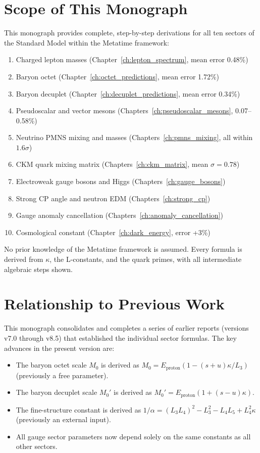 \section{Scope of This Monograph}

This monograph provides complete, step-by-step derivations for all ten sectors
of the Standard Model within the Metatime framework:

\begin{enumerate}
\item Charged lepton masses (Chapter~\ref{ch:lepton_spectrum}, mean error 0.48\%)
\item Baryon octet (Chapter~\ref{ch:octet_predictions}, mean error 1.72\%)
\item Baryon decuplet (Chapter~\ref{ch:decuplet_predictions}, mean error 0.34\%)
\item Pseudoscalar and vector mesons (Chapters~\ref{ch:pseudoscalar_mesons}, 0.07--0.58\%)
\item Neutrino PMNS mixing and masses (Chapters~\ref{ch:pmns_mixing}, all within \(1.6\sigma\))
\item CKM quark mixing matrix (Chapters~\ref{ch:ckm_matrix}, mean \(\sigma = 0.78\))
\item Electroweak gauge bosons and Higgs (Chapters~\ref{ch:gauge_bosons})
\item Strong CP angle and neutron EDM (Chapters~\ref{ch:strong_cp})
\item Gauge anomaly cancellation (Chapters~\ref{ch:anomaly_cancellation})
\item Cosmological constant (Chapter~\ref{ch:dark_energy}, error +3\%)
\end{enumerate}

No prior knowledge of the Metatime framework is assumed.  Every formula is
derived from \(\kappa\), the L-constants, and the quark primes, with all
intermediate algebraic steps shown.

\section{Relationship to Previous Work}

This monograph consolidates and completes a series of earlier reports
(versions v7.0 through v8.5) that established the individual sector formulas.
The key advances in the present version are:

\begin{itemize}
\item The baryon octet scale \(M_0\) is derived as
\(M_0 = E_{\text{proton}}(1 - (s+u)\kappa/L_3)\) (previously a free parameter).
\item The baryon decuplet scale \(M_0'\) is derived as
\(M_0' = E_{\text{proton}}(1 + (s-u)\kappa)\).
\item The fine-structure constant is derived as
\(1/\alpha = (L_3L_4)^2 - L_3^2 - L_4L_5 + L_4^2\kappa\) (previously an
external input).
\item All gauge sector parameters now depend solely on the same constants
as all other sectors.
\end{itemize}

